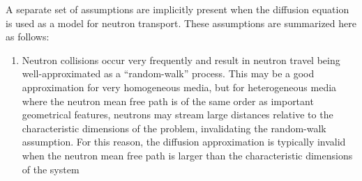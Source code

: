 A separate set of assumptions are implicitly present when the diffusion equation is used as a model for neutron transport. These assumptions are summarized here as follows:

\begin{enumerate}
\item Neutron collisions occur very frequently and result in neutron travel being well-approximated as a ``random-walk'' process. This may be a good approximation for very homogeneous media, but for heterogeneous media where the neutron mean free path is of the same order as important geometrical features, neutrons may stream large distances relative to the characteristic dimensions of the problem, invalidating the random-walk assumption. For this reason, the diffusion approximation is typically invalid when the neutron mean free path is larger than the characteristic dimensions of the system %
\end{enumerate}
